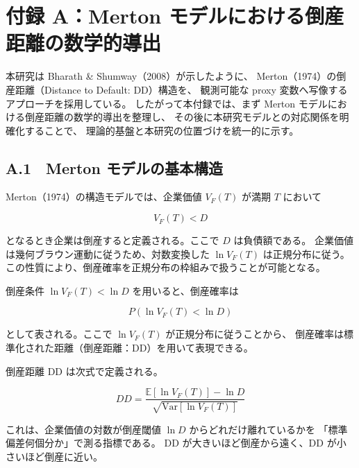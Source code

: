 \chapter*{付録 A：Merton モデルにおける倒産距離の数学的導出}

本研究は Bharath \& Shumway（2008）が示したように、
Merton（1974）の倒産距離（Distance to Default: DD）構造を、
観測可能な proxy 変数へ写像するアプローチを採用している。
したがって本付録では、まず Merton モデルにおける倒産距離の数学的導出を整理し、
その後に本研究モデルとの対応関係を明確化することで、
理論的基盤と本研究の位置づけを統一的に示す。

\section*{A.1　Merton モデルの基本構造}

Merton（1974）の構造モデルでは、企業価値 $V_F(T)$ が満期 $T$ において



\[
V_F(T) < D
\]



となるとき企業は倒産すると定義される。ここで $D$ は負債額である。
企業価値は幾何ブラウン運動に従うため、対数変換した $\ln V_F(T)$ は正規分布に従う。
この性質により、倒産確率を正規分布の枠組みで扱うことが可能となる。

倒産条件 $\ln V_F(T) < \ln D$ を用いると、倒産確率は



\[
P\left( \ln V_F(T) < \ln D \right)
\]



として表される。ここで $\ln V_F(T)$ が正規分布に従うことから、
倒産確率は標準化された距離（倒産距離：DD）を用いて表現できる。

倒産距離 DD は次式で定義される。



\[
DD = \frac{\mathbb{E}[\ln V_F(T)] - \ln D}{\sqrt{\mathrm{Var}[\ln V_F(T)]}}
\]



これは、企業価値の対数が倒産閾値 $\ln D$ からどれだけ離れているかを
「標準偏差何個分か」で測る指標である。
DD が大きいほど倒産から遠く、DD が小さいほど倒産に近い。

